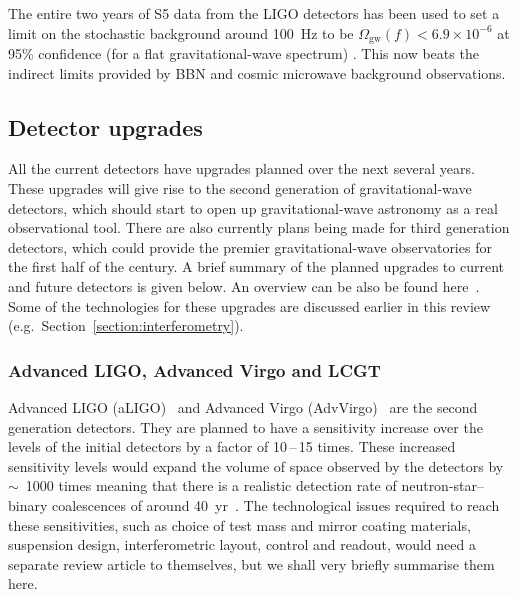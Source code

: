 \documentclass{article}
\begin{document}
The entire two years of S5 data from the LIGO detectors has been used to set a
limit on the stochastic background around 100~Hz to be $\Omega_{\mathrm{gw}}(f) <
6.9\times10^{-6}$ at 95\% confidence (for a flat gravitational-wave spectrum)
\cite{Abbott:2009b}. This now beats the indirect limits provided by BBN and cosmic microwave background observations.

\subsection{Detector upgrades}

All the current detectors have upgrades planned over the next several years.
These upgrades will give rise to the second generation of gravitational-wave
detectors, which should start to open up gravitational-wave astronomy as a
real observational tool. There are also currently plans being made for third
generation detectors, which could provide the premier gravitational-wave
observatories for the first half of the century. A brief summary of the planned
upgrades to current and future detectors is given below. An overview can be also
be found here~\cite{Whitcomb:2008}. Some of the technologies for these upgrades
are discussed earlier in this review (e.g.\, Section~\ref{section:interferometry}).

\subsubsection{Advanced LIGO, Advanced Virgo and LCGT}
\label{subsection:aligo}

Advanced LIGO (aLIGO)~\cite{Harry:2010, AdvLIGO, AdvLIGOweb} and Advanced Virgo
(AdvVirgo)~\cite{AdvVirgoDesign, AdvVirgoweb} are the second generation
detectors. They are planned to have a sensitivity increase over the levels of
the initial detectors by a factor of 10\,--\,15 times. These increased sensitivity
levels would expand the volume of space observed by the detectors by $\sim$~1000
times meaning that there is a realistic detection rate of neutron-star--binary
coalescences of around 40~yr~\cite{Abadie:2010e, Kopparapu:2008}.
The technological issues required to reach these sensitivities, such as choice
of test mass and mirror coating materials, suspension design, interferometric
layout, control and readout, would need a separate review article to themselves,
but we shall very briefly summarise them here.
\end{document}
